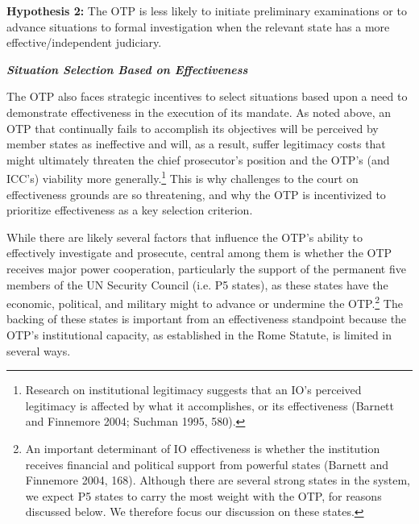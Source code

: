 \textbf{Hypothesis 2:} The OTP is less likely to initiate preliminary examinations or to advance situations to formal investigation when the relevant state has a more effective/independent judiciary.

\emph{\textbf{Situation Selection Based on Effectiveness}}

The OTP also faces strategic incentives to select situations based upon a need to demonstrate effectiveness in the execution of its mandate. As noted above, an OTP that continually fails to accomplish its objectives will be perceived by member states as ineffective and will, as a result, suffer legitimacy costs that might ultimately threaten the chief prosecutor's position and the OTP's (and ICC's) viability more generally.\footnote{Research on institutional legitimacy suggests that an IO's perceived legitimacy is affected by what it accomplishes, or its effectiveness (Barnett and Finnemore 2004; Suchman 1995, 580).} This is why challenges to the court on effectiveness grounds are so threatening, and why the OTP is incentivized to prioritize effectiveness as a key selection criterion.

While there are likely several factors that influence the OTP's ability to effectively investigate and prosecute, central among them is whether the OTP receives major power cooperation, particularly the support of the permanent five members of the UN Security Council (i.e. P5 states), as these states have the economic, political, and military might to advance or undermine the OTP.\footnote{An important determinant of IO effectiveness is whether the institution receives financial and political support from powerful states (Barnett and Finnemore 2004, 168). Although there are several strong states in the system, we expect P5 states to carry the most weight with the OTP, for reasons discussed below. We therefore focus our discussion on these states.} The backing of these states is important from an effectiveness standpoint because the OTP's institutional capacity, as established in the Rome Statute, is limited in several ways.

